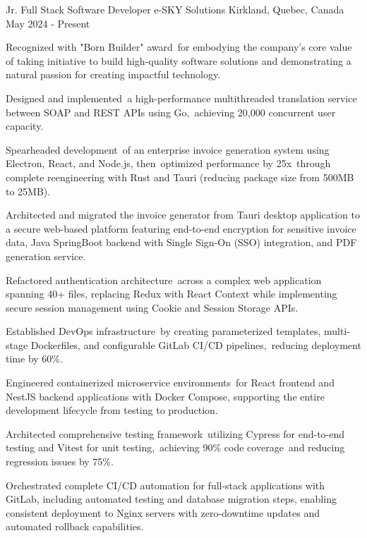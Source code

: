 

\begin{cventries}

  \cventry
   {Jr. Full Stack Software Developer} %
    {e-SKY Solutions} %
    {Kirkland, Quebec, Canada} %
    {May 2024 - Present} %
    {
      \begin{cvitems} %
        \item {Recognized with "Born Builder" award for embodying the company's core value of taking initiative to build high-quality software solutions and demonstrating a natural passion for creating impactful technology.}
        \item {Designed and implemented a high-performance multithreaded translation service between SOAP and REST APIs using Go, achieving 20,000 concurrent user capacity.}
        \item {Spearheaded development of an enterprise invoice generation system using Electron, React, and Node.js, then optimized performance by 25x through complete reengineering with Rust and Tauri (reducing package size from 500MB to 25MB).}
        \item {Architected and migrated the invoice generator from Tauri desktop application to a secure web-based platform featuring end-to-end encryption for sensitive invoice data, Java SpringBoot backend with Single Sign-On (SSO) integration, and PDF generation service.}
        \item {Refactored authentication architecture across a complex web application spanning 40+ files, replacing Redux with React Context while implementing secure session management using Cookie and Session Storage APIs.}
        \item {Established DevOps infrastructure by creating parameterized templates, multi-stage Dockerfiles, and configurable GitLab CI/CD pipelines, reducing deployment time by 60\%.}
        \item {Engineered containerized microservice environments for React frontend and NestJS backend applications with Docker Compose, supporting the entire development lifecycle from testing to production.}
        \item{Architected comprehensive testing framework utilizing Cypress for end-to-end testing and Vitest for unit testing, achieving 90\% code coverage and reducing regression issues by 75\%.}
        \item{Orchestrated complete CI/CD automation for full-stack applications with GitLab, including automated testing and database migration steps, enabling consistent deployment to Nginx servers with zero-downtime updates and automated rollback capabilities.}
      \end{cvitems}
    }
    

\end{cventries}
